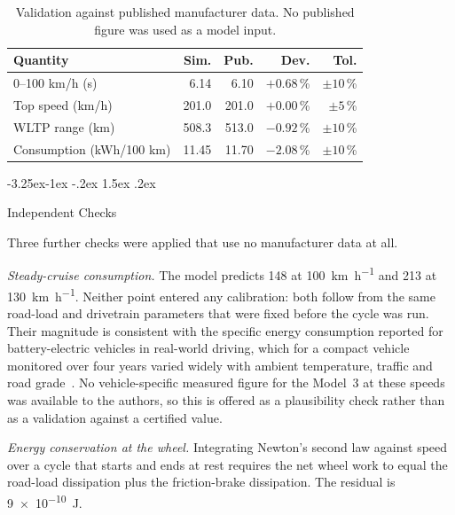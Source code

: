 \documentclass[twocolumn]{article}
\makeatletter
\newenvironment{loosepar}{\par\sloppy\hbadness=10000\relax}{\par}
\renewcommand\subsection{\@startsection{subsection}{2}{\z@}%
  {-3.25ex\@plus -1ex \@minus -.2ex}%
  {1.5ex \@plus .2ex}%
  {\raggedright\normalfont\large\bfseries}}
\makeatother
\begin{document}
\begin{table}[H]
\centering
\caption{Validation against published manufacturer data. No published figure
was used as a model input.}
\label{tab:validation}
\footnotesize
\begin{tabular}{@{}lrrrr@{}}
\toprule
\textbf{Quantity} & \textbf{Sim.} & \textbf{Pub.} & \textbf{Dev.} & \textbf{Tol.} \\
\midrule
0--100 km/h (s)            & 6.14   & 6.10   & $+0.68$\,\% & $\pm10$\,\% \\
Top speed (km/h)           & 201.0  & 201.0  & $+0.00$\,\% & $\pm5$\,\%  \\
WLTP range (km)            & 508.3  & 513.0  & $-0.92$\,\% & $\pm10$\,\% \\
Consumption (kWh/100 km)   & 11.45  & 11.70  & $-2.08$\,\% & $\pm10$\,\% \\
\bottomrule
\end{tabular}
\end{table}

\subsection{Independent Checks}

Three further checks were applied that use no manufacturer data at all.

\begin{loosepar}
\emph{Steady-cruise consumption.} The model predicts
\SI{148}{\Whpkm} at \SI{100}{\kilo\metre\per\hour} and
\SI{213}{\Whpkm} at \SI{130}{\kilo\metre\per\hour}. Neither point entered
any calibration: both follow from the same road-load and drivetrain parameters
that were fixed before the cycle was run. Their magnitude is consistent with
the specific energy consumption reported for battery-electric vehicles in
real-world driving, which for a compact vehicle monitored over four years
varied widely with ambient temperature, traffic and road
grade~\cite{alwreikat2021}. No vehicle-specific measured figure for the
Model~3 at these speeds was available to the authors, so this is offered as a
plausibility check rather than as a validation against a certified value.
\end{loosepar}

\emph{Energy conservation at the wheel.} Integrating Newton's second law
against speed over a cycle that starts and ends at rest requires the net wheel
work to equal the road-load dissipation plus the friction-brake dissipation.
The residual is \SI{9e-10}{\joule}.
\end{document}
